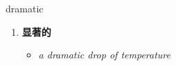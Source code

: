 
\begin{frame}
{\huge dramatic}
\begin{center}
\begin{enumerate}\Large
  \item \textbf{显著的}
  \begin{itemize}
    \item \em{\Large{a dramatic drop of temperature}}
  \end{itemize}
\end{enumerate}
\end{center}
\end{frame}
